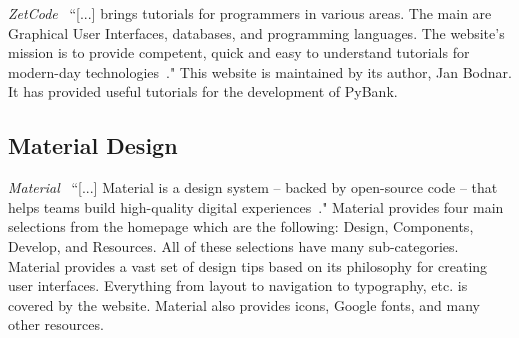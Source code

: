 \emph{ZetCode}~\cite{ZETCODE:4} ``[...] brings tutorials for programmers in various areas. The main are Graphical User Interfaces, databases, and programming languages. The website's mission is to provide competent, quick and easy to understand tutorials for modern-day technologies~\cite{ZETCODE:4}." This website is maintained by its author, Jan Bodnar. It has provided useful tutorials for the development of PyBank.

\subsection{Material Design}
\label{sect:material_design}

\emph{Material}~\cite{MATERIAL:7} ``[...] Material is a design system – backed by open-source code – that helps teams build high-quality digital experiences~\cite{MATERIAL:7}." Material provides four main selections from the homepage which are the following: Design, Components, Develop, and Resources. All of these selections have many sub-categories. Material provides a vast set of design tips based on its philosophy for creating user interfaces. Everything from layout to navigation to typography, etc. is covered by the website. Material also provides icons, Google fonts, and many other resources.

